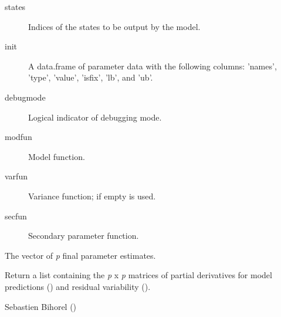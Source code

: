 \begin{Arguments}
\begin{ldescription}
\begin{description}
\begin{description}
\end{description}

\item[states] Indices of the states to be output by the model.
\item[init] A data.frame of parameter data with the following columns:
'names', 'type', 'value', 'isfix', 'lb', and 'ub'.
\item[debugmode] Logical indicator of debugging mode.
\item[modfun] Model function.
\item[varfun] Variance function; if empty  is
used.
\item[secfun] Secondary parameter function.

\end{description}


\item[\code{x}] The vector of \emph{p} final parameter estimates.
\end{ldescription}
\end{Arguments}
%
\begin{Value}
Return a list containing the \emph{p} x \emph{p} matrices of partial
derivatives for model predictions () and residual variability
().
\end{Value}
%
\begin{Author}\relax
Sebastien Bihorel ()
\end{Author}
%
\begin{SeeAlso}\relax
{}
\end{SeeAlso}
